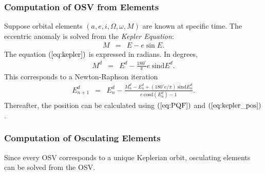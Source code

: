 \documentclass [12pt, a4paper] {article}
\newcommand{\sind}
{
	\textrm{sind}
}
\newcommand{\cosd}
{
	\textrm{cosd}
}
\begin{document}
\subsubsection{Computation of OSV from Elements}
Suppose orbital elements $(a, e, i, \Omega, \omega, M)$ are known at 
specific time. The eccentric anomaly is solved from the \emph{Kepler Equation}:
\begin {eqnarray}
  \label{eq:kepler}
  M &=& E - e\sin E.
\end {eqnarray}
The equation $(\ref{eq:kepler})$ is expressed in radians. In degrees,
\begin {eqnarray}
\label{eq:kepler_deg}
M^d &=& E^d - \frac{180^\circ}{\pi}e\:\sind E^d.
\end {eqnarray}
This corresponds to a Newton-Raphson iteration
\begin {eqnarray}
  E^d_{n+1} &=& E^d_n 
  - 
  \frac{M_n^d - E_n^d + (180^\circ e/\pi)\:\sind{E_n^d}}{e\:\cosd(E_n^d) - 1}.
\end {eqnarray}
Thereafter, the position can be calculated using $(\ref{eq:PQF})$ and 
$(\ref{eq:kepler_pos})$.

\subsubsection{Computation of Osculating Elements}
Since every OSV corresponds to a unique Keplerian orbit, osculating elements 
can be solved from the OSV. 
\end{document}
